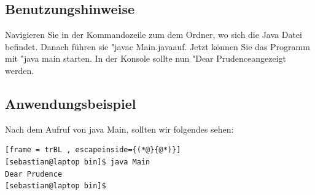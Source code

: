 \subsection{Benutzungshinweise}
Navigieren Sie in der Kommandozeile zum dem Ordner, wo sich die Java Datei befindet.
Danach führen sie "javac Main.java\dq \space auf. Jetzt können Sie das Programm mit "java main\dq \space
 starten. In der Konsole sollte nun "Dear Prudence\dq \space angezeigt werden.

\subsection{Anwendungsbeispiel}
Nach dem Aufruf von java Main, sollten wir folgendes sehen:
\begin{lstlisting}[frame = trBL , escapeinside={(*@}{@*)}]
[sebastian@laptop bin]$ java Main 
Dear Prudence
[sebastian@laptop bin]$ 
\end{lstlisting}